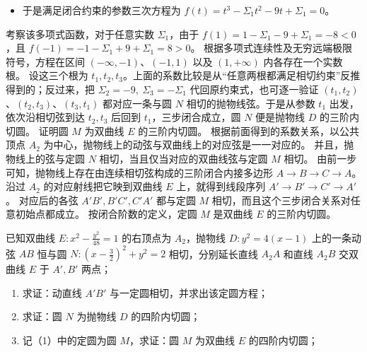 \begin{solution}
\begin{itemize}
\item 于是满足闭合约束的参数三次方程为 $f(t) = t^3 - \Sigma_1 t^2 - 9t + \Sigma_1 = 0$。
\end{itemize}
考察该多项式函数，对于任意实数 $\Sigma_1$，由于 $f(1) = 1 - \Sigma_1 - 9 + \Sigma_1 = -8 < 0$，且 $f(-1) = -1 - \Sigma_1 + 9 + \Sigma_1 = 8 > 0$。
根据多项式连续性及无穷远端极限符号，方程在区间 $(-\infty, -1)$、$(-1, 1)$ 以及 $(1, +\infty)$ 内各存在一个实数根。
设这三个根为 $t_1,t_2,t_3$。上面的系数比较是从“任意两根都满足相切约束”反推得到的；反过来，把 $\Sigma_2=-9,\ \Sigma_3=-\Sigma_1$ 代回原约束式，也可逐一验证 $(t_1,t_2)$、$(t_2,t_3)$、$(t_3,t_1)$ 都对应一条与圆 $N$ 相切的抛物线弦。于是从参数 $t_1$ 出发，依次沿相切弦到达 $t_2,t_3$ 后回到 $t_1$，三步闭合成立，圆 $N$ 便是抛物线 $D$ 的三阶内切圆。
证明圆 $M$ 为双曲线 $E$ 的三阶内切圆。
根据前面得到的系数关系，以公共顶点 $A_2$ 为中心，抛物线上的动弦与双曲线上的对应弦是一一对应的。
并且，抛物线上的弦与定圆 $N$ 相切，当且仅当对应的双曲线弦与定圆 $M$ 相切。
由前一步可知，抛物线上存在由连续相切弦构成的三阶闭合内接多边形 $A \to B \to C \to A$。
沿过 $A_2$ 的对应射线把它映到双曲线 $E$ 上，就得到线段序列 $A' \to B' \to C' \to A'$。
对应后的各弦 $A'B', B'C', C'A'$ 都与定圆 $M$ 相切，而且这个三步闭合关系对任意初始点都成立。
按闭合阶数的定义，定圆 $M$ 是双曲线 $E$ 的三阶内切圆。
\end{solution}

\begin{exercise}
已知双曲线 $E: x^2 - \frac{y^2}{48} = 1$ 的右顶点为 $A_2$，抛物线 $D: y^2 = 4(x - 1)$ 上的一条动弦 $AB$ 恒与圆 $N: \left(x - \frac{3}{2}\right)^2 + y^2 = 2$ 相切，分别延长直线 $A_2A$ 和直线 $A_2B$ 交双曲线 $E$ 于 $A',B'$ 两点；
\begin{enumerate}
    \item 求证：动直线 $A'B'$ 与一定圆相切，并求出该定圆方程；
    \item 求证：圆 $N$ 为抛物线 $D$ 的四阶内切圆；
    \item 记（1）中的定圆为圆 $M$，求证：圆 $M$ 为双曲线 $E$ 的四阶内切圆；
\end{enumerate}
\end{exercise}

